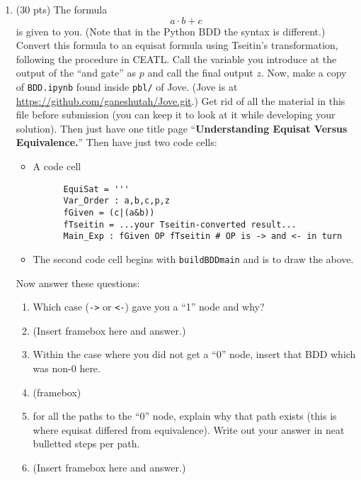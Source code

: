\documentclass[11pt]{article}
\begin{document}
\begin{enumerate}
\item (30 pts) The formula
  \[ a\cdot b + c \]
  is given to you. (Note that in the Python BDD the syntax is different.)
  Convert this formula to an equisat formula using Tseitin's transformation,
  following the procedure in CEATL. Call the variable you introduce at the output
  of the ``and gate'' as $p$ and call the final output $z$.
  Now, make a copy of \verb|BDD.ipynb| found inside \verb|pbl/| of Jove.
  (Jove is at \url{https://github.com/ganeshutah/Jove.git}.)
  Get rid of all the material in this file before submission (you can keep it to look at it
  while developing your solution).
  Then just have one title page ``{\bf Understanding Equisat Versus Equivalence.}''
  Then have just two code cells:
  \begin{itemize}
  \item A code cell
    \begin{verbatim}
      EquiSat = '''
      Var_Order : a,b,c,p,z
      fGiven = (c|(a&b))
      fTseitin = ...your Tseitin-converted result...
      Main_Exp : fGiven OP fTseitin # OP is -> and <- in turn
\end{verbatim}
  \item The second code cell begins with {\tt buildBDDmain} and is to draw the above.
  \end{itemize}
  
  Now answer these questions:
  
  \begin{enumerate}
  \item Which case (\verb|->| or \verb|<-|) gave you a ``1'' node and why?

  \item[] (Insert framebox here and answer.)

  \item Within the case
    where you did not get a ``0'' node,
    insert that BDD which was non-0 here.
  \item[] (framebox)
  \item
    for all the paths to the ``0'' node,
    explain why that path exists (this is where equisat differed from equivalence).
    Write out your answer in neat bulletted steps per path.
  \item[] (Insert framebox here and answer.)
  \end{enumerate}

  \clearpage
  
 

\end{enumerate}
\end{document}
